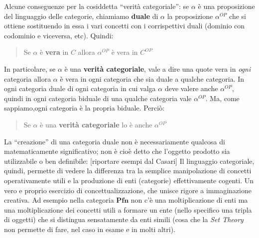 \documentclass[a4paper, 11pt]{article}
\begin{document}
Alcune conseguenze per la cosiddetta ``verità categoriale'': se $\alpha$ è una proposizione del linguaggio delle categorie, chiamiamo \textbf{duale} di $\alpha$ la proposizione $\alpha^{OP}$ che si ottiene sostituendo in essa i vari concetti con i corrispettivi duali (dominio con codominio e viceversa, etc). Quindi:
\begin{quote}
	Se $\alpha$ è \textbf{vera} in $C$ allora $\alpha^{OP}$ è vera in $C^{OP}$
\end{quote}
In particolare, se $\alpha$ è una \textbf{verità categoriale}, vale a dire una quote vera in \textit{ogni} categoria allora $\alpha$ è vera in ogni categoria che sia duale a qualche categoria. In ogni categoria duale di ogni categoria in cui valga $\alpha$ deve valere anche $\alpha^{OP}$, quindi in ogni categoria biduale di una qualche categoria vale $\alpha^{OP}$. Ma, come sappiamo,ogni categoria è la propria biduale. Perciò:
\begin{quote}
	Se $\alpha$ è una \textbf{verità categoriale} lo è anche $\alpha^{OP}$
\end{quote}
La ``creazione'' di una categoria duale non è necessariamente qualcosa di matematicamente significativo; non è cioè detto che l'oggetto prodotto sia utilizzabile o ben definibile: [riportare esempi dal Casari]
Il linguaggio categoriale, quindi, permette di vedere la differenza tra la semplice manipolazione di concetti operativamente utili e la produzione di enti (categorie) effettivamente cogenti. Un vero e proprio esercizio di concettualizzazione, che unisce rigore a immaginazione creativa. Ad esempio nella categoria $\textbf{Pfn}$ non c'è una moltiplicazione di enti ma una moltiplicazione dei concetti utili a formare un ente (nello specifico una tripla di oggetti) che si distingua sensatamente da enti simili (cosa che la \textit{Set Theory} non permette di fare, nel caso in esame e in molti altri).
\end{document}
